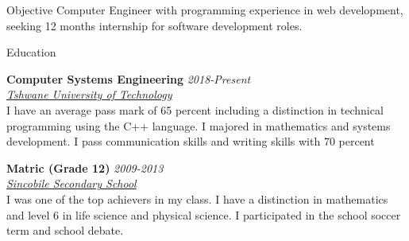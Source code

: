 \documentclass{resume} %
\newcommand{\sepspace}{\vspace*{1em}}           %
\newcommand{\EducationEntry}[4]{
        \noindent \textbf{#1} \hfill \textit{#2} \\     %
        \noindent \textit{#3} \\        %
        \noindent  #4  %
        \normalsize \par}
\begin{document}
\begin{rSection}{Objective}
{Computer Engineer with programming experience in web development, seeking 12 months internship  for software development roles.}
\end{rSection}

\begin{rSection}{Education}
        \EducationEntry{Computer Systems Engineering}{2018-Present}
        {\href{https://www.tut.ac.za/} {Tshwane University of Technology}}
        {I have an average pass mark of 65 percent including a distinction in technical programming using the C++ language. I majored in mathematics and systems  development. I pass communication skills and writing skills with 70 percent}

        \EducationEntry{Matric (Grade 12)}{2009-2013}
        {\href{https://sincobilesecondaryschool.co.za/}{Sincobile Secondary School}}
        {I was one of the top achievers in my class. I have a distinction in mathematics and level 6 in life science and physical science. I participated in the school soccer term and school debate.}
\end{rSection}
\end{document}
